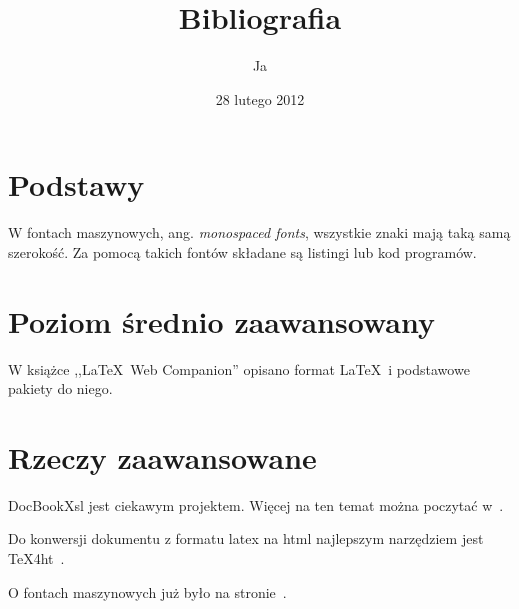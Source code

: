\documentclass[a4paper,12pt]{article}
\title{Bibliografia}
\author{Ja}
\date{28 lutego 2012}
\begin{document}
\maketitle
\tableofcontents

\section{Podstawy}\label{sec:basics}

W fontach maszynowych, ang. \emph{monospaced fonts},
wszystkie znaki mają taką samą  szerokość. Za pomocą takich
fontów składane są listingi lub kod programów.

\section{Poziom średnio zaawansowany}\label{sec:intermediate}

W książce ,,\LaTeX\ Web Companion'' opisano
format \LaTeX\ i podstawowe pakiety do niego.

\section{Rzeczy zaawansowane}\label{sec:advanced}

DocBookXsl jest ciekawym projektem. Więcej na ten temat
można poczytać w~\cite{wiki.docbookxsl}.

Do konwersji dokumentu z formatu latex na html najlepszym narzędziem
jest TeX4ht~\cite[uwaga, system szuka nowego opiekuna]{Gurari.TeX4ht}.

O fontach maszynowych już było na stronie~\pageref{sec:basics}.


\end{document}

